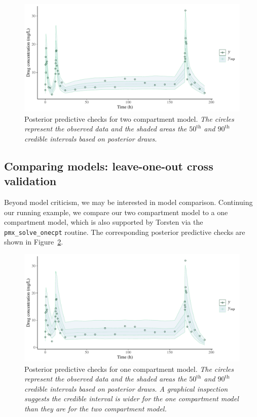 \begin{figure}
  \begin{center}
  \includegraphics[width=6in]{../figures/twocpt_ppc_4x8.pdf}
  \end{center}
  \caption{Posterior predictive checks for two compartment model. \textit{The circles represent the observed data and the shaded areas the $50^\mathrm{th}$ and $90^\mathrm{th}$ credible intervals based on posterior draws.}}
  \label{fig:ppc} 
\end{figure}

\subsection{Comparing models: leave-one-out cross validation}

Beyond model criticism, we may be interested in model comparison.
Continuing our running example, we compare our two compartment model to a one compartment model, which is also supported by Torsten via the \texttt{pmx\_solve\_onecpt} routine.
The corresponding posterior predictive checks are shown in Figure~\ref{fig:ppc_onecpt}.

\begin{figure}
  \begin{center}
  \includegraphics[width=6in]{../figures/onecpt_ppc_4x8.pdf}
  \end{center}
  \caption{Posterior predictive checks for one compartment model. \textit{The circles represent the observed data and the shaded areas the $50^\mathrm{th}$ and $90^\mathrm{th}$ credible intervals based on posterior draws. A graphical inspection suggests the credible interval is wider for the one compartment model than they are for the two compartment model.}}
  \label{fig:ppc_onecpt} 
\end{figure}

